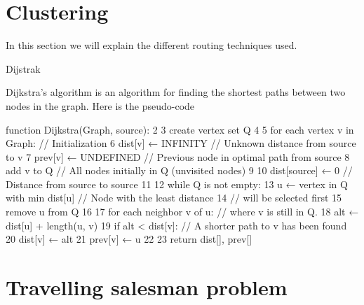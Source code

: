 \section{Clustering} 
\label{Clustering_thecnical}

\label{Routing_thecnical}
In this section we will explain the different routing techniques used.

Dijstrak


Dijkstra's algorithm is an algorithm for finding the shortest paths between two nodes in the graph.
Here is the pseudo-code

function Dijkstra(Graph, source):
 2
 3      create vertex set Q
 4
 5      for each vertex v in Graph:             // Initialization
 6          dist[v] ← INFINITY                  // Unknown distance from source to v
 7          prev[v] ← UNDEFINED                 // Previous node in optimal path from source
 8          add v to Q                          // All nodes initially in Q (unvisited nodes)
 9
10      dist[source] ← 0                        // Distance from source to source
11      
12      while Q is not empty:
13          u ← vertex in Q with min dist[u]    // Node with the least distance
14                                                      // will be selected first
15          remove u from Q 
16          
17          for each neighbor v of u:           // where v is still in Q.
18              alt ← dist[u] + length(u, v)
19              if alt < dist[v]:               // A shorter path to v has been found
20                  dist[v] ← alt 
21                  prev[v] ← u 
22
23      return dist[], prev[]


\section{Travelling salesman problem}



